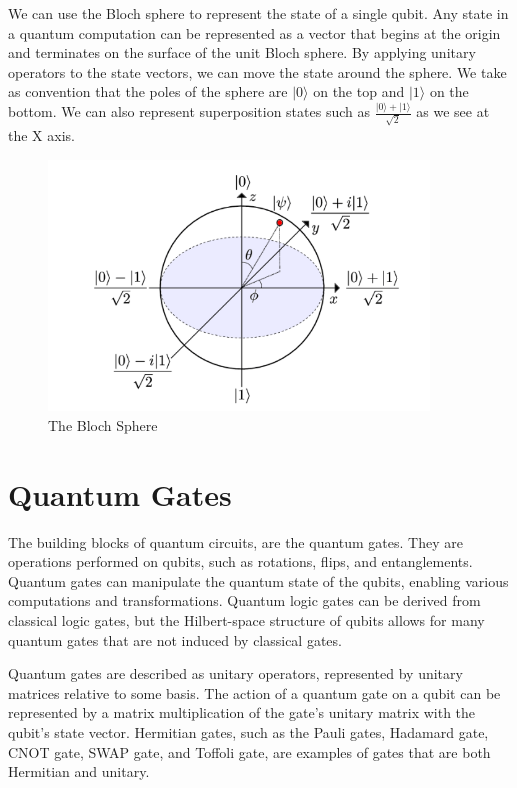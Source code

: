 \documentclass[inscr,ack,preface]{diphdthesis}
\begin{document}
We can use the Bloch sphere to represent the state of a single qubit. Any
state in a quantum computation can be represented as a vector that begins at
the origin and terminates on the surface of the unit Bloch sphere. By applying
unitary operators to the state vectors, we can move the state around the sphere.
We take as convention that the poles of the sphere are $\vert0\rangle$ on the top and $\vert1\rangle$ on the bottom. \cite{hidary}
We can also represent superposition states such as 
\Large $\frac{\lvert 0 \rangle + \lvert 1 \rangle}{\sqrt{2}}$ 
\normalsize as we see at the X axis.
\begin{figure}[ht]
    \includegraphics[width=0.9\textwidth]{bloch.png}
    \caption{The Bloch Sphere}
    \label{fig:enter-label}
\end{figure}

\cite{kockum2014quantum}


\section{Quantum Gates}

The building blocks of quantum circuits, are the quantum gates. They are operations performed on qubits, such as rotations, flips, and entanglements. Quantum gates can manipulate the quantum state of the qubits, enabling various computations and transformations. Quantum logic gates can be derived from classical logic gates, but the Hilbert-space structure of qubits allows for many quantum gates that are not induced by classical gates.

Quantum gates are described as unitary operators, represented by unitary matrices relative to some basis. The action of a quantum gate on a qubit can be represented by a matrix multiplication of the gate's unitary matrix with the qubit's state vector. Hermitian gates, such as the Pauli gates, Hadamard gate, CNOT gate, SWAP gate, and Toffoli gate, are examples of gates that are both Hermitian and unitary.
\end{document}
